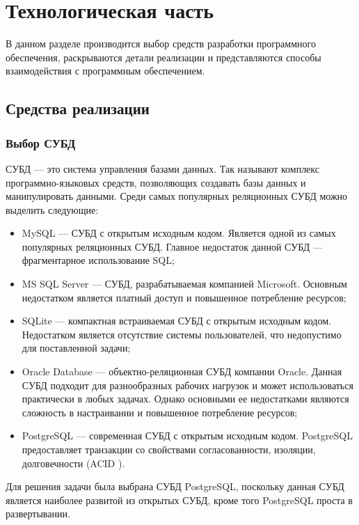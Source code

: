 \chapter{Технологическая часть}

В данном разделе производится выбор средств разработки программного обеспечения, раскрываются детали реализации и представляются способы взаимодействия с программным обеспечением.

\section{Средства реализации}

\subsection{Выбор СУБД}

СУБД --- это система управления базами данных. Так называют комплекс программно-языковых средств, позволяющих создавать базы данных и манипулировать данными.
Среди самых популярных реляционных СУБД можно выделить следующие:

\begin{itemize}
	\item MySQL --- СУБД с открытым исходным кодом. Является одной из самых популярных реляционных СУБД. Главное недостаток данной СУБД --- фрагментарное использование SQL;
	\item MS SQL Server --- СУБД, разрабатываемая компанией Microsoft. Основным недостатком является платный доступ и повышенное потребление ресурсов;
 	\item SQLite --- компактная встраиваемая СУБД с открытым исходным кодом. Недостатком является отсутствие системы пользователей, что недопустимо для поставленной задачи;
  	\item Oracle Database --- объектно-реляционная СУБД компании Oracle. Данная СУБД подходит для разнообразных рабочих нагрузок и может использоваться практически в любых задачах. Однако основными ее недостатками являются сложность в настраивании и повышенное потребление ресурсов;
   \item PostgreSQL --- современная СУБД с открытым исходным кодом. PostgreSQL предоставляет транзакции со свойствами согласованности, изоляции, долговечности (ACID \cite{acid}).
\end{itemize}

Для решения задачи была выбрана СУБД PostgreSQL, поскольку данная СУБД является наиболее развитой из открытых СУБД, кроме того PostgreSQL проста в развертывании.

